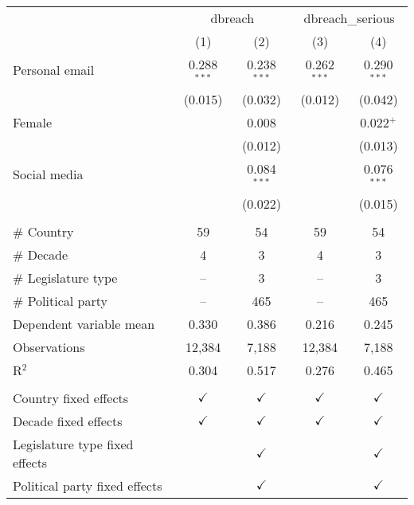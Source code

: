 
\begingroup
\centering
\begin{adjustbox}{width = \textwidth, center}
   \begin{tabular}{lcccc}
      \toprule
       & \multicolumn{2}{c}{dbreach} & \multicolumn{2}{c}{dbreach\_serious}\\
                                     & (1)           & (2)           & (3)           & (4)\\  
      \midrule 
      Personal email                 & 0.288$^{***}$ & 0.238$^{***}$ & 0.262$^{***}$ & 0.290$^{***}$\\   
                                     & (0.015)       & (0.032)       & (0.012)       & (0.042)\\   
      Female                         &               & 0.008         &               & 0.022$^{+}$\\   
                                     &               & (0.012)       &               & (0.013)\\   
      Social media                   &               & 0.084$^{***}$ &               & 0.076$^{***}$\\   
                                     &               & (0.022)       &               & (0.015)\\   
       \\
      \# Country                     & 59            & 54            & 59            & 54\\  
      \# Decade                      & 4             & 3             & 4             & 3\\  
      \# Legislature type            & --            & 3             & --            & 3\\  
      \# Political party             & --            & 465           & --            & 465\\  
      Dependent variable mean        & 0.330         & 0.386         & 0.216         & 0.245\\  
      Observations                   & 12,384        & 7,188         & 12,384        & 7,188\\  
      R$^2$                          & 0.304         & 0.517         & 0.276         & 0.465\\  
       \\
      Country fixed effects          & $\checkmark$  & $\checkmark$  & $\checkmark$  & $\checkmark$\\   
      Decade fixed effects           & $\checkmark$  & $\checkmark$  & $\checkmark$  & $\checkmark$\\   
      Legislature type fixed effects &               & $\checkmark$  &               & $\checkmark$\\   
      Political party fixed effects  &               & $\checkmark$  &               & $\checkmark$\\   
      \bottomrule
   \end{tabular}
\end{adjustbox}
\par\endgroup


